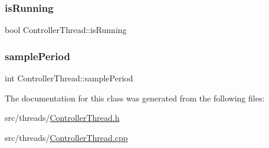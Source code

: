 \mbox{\label{classControllerThread_ad00ac5cba8e74a5ea69d5caace8c9954}} 
\subsubsection{\texorpdfstring{is\+Running}{isRunning}}
{\footnotesize\ttfamily bool Controller\+Thread\+::is\+Running\hspace{0.3cm}{\ttfamily [private]}}

\mbox{\label{classControllerThread_a5dcd0069c7d31295c7e1e598c31fadf7}} 
\subsubsection{\texorpdfstring{sample\+Period}{samplePeriod}}
{\footnotesize\ttfamily int Controller\+Thread\+::sample\+Period\hspace{0.3cm}{\ttfamily [private]}}



The documentation for this class was generated from the following files\+:\begin{DoxyCompactItemize}
\item 
src/threads/\hyperlink{ControllerThread_8h}{Controller\+Thread.\+h}\item 
src/threads/\hyperlink{ControllerThread_8cpp}{Controller\+Thread.\+cpp}\end{DoxyCompactItemize}
